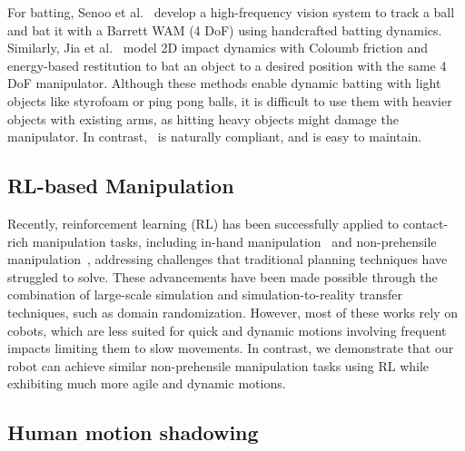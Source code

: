 For batting, Senoo et al.~\cite{high_speed_batting} develop a high-frequency vision system to track a ball and bat it with a Barrett WAM (4 DoF) using handcrafted batting dynamics. Similarly, Jia et al.~\cite{jia2019batting} model 2D impact dynamics with Coloumb friction and energy-based restitution to bat an object to a desired position with the same 4 DoF manipulator. Although these methods enable dynamic batting with light objects like styrofoam or ping pong balls, it is difficult to use them with heavier objects with existing arms, as hitting heavy objects might damage the manipulator. In contrast, \robot~is naturally compliant, and is easy to maintain.


\subsection{RL-based Manipulation}


Recently, reinforcement learning (RL) has been successfully applied to contact-rich manipulation tasks, including in-hand manipulation~\cite{chen2022system, andrychowicz2020learning, allshire2022transferring, handa2023dextreme} and non-prehensile manipulation~\cite{zhou2023hacman, zhou2023learning, cho2024corn, kim2023pre}, addressing challenges that traditional planning techniques have struggled to solve. These advancements have been made possible through the combination of large-scale simulation and simulation-to-reality transfer techniques, such as domain randomization. However, most of these works rely on cobots, which are less suited for quick and dynamic motions involving frequent impacts limiting them to slow movements. In contrast, we demonstrate that our robot can achieve similar non-prehensile manipulation tasks using RL while exhibiting much more agile and dynamic motions.

\subsection{Human motion shadowing}

